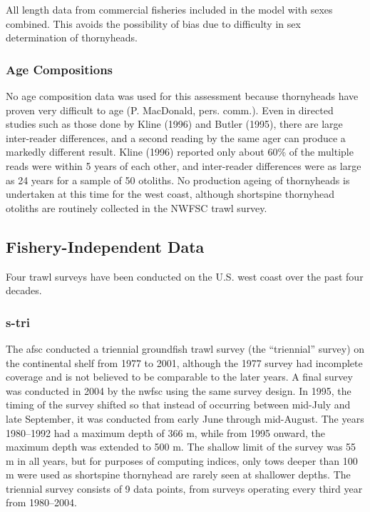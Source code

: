 \documentclass[11pt,
  english,
  letterpaper,
]{article}
\begin{document}
All length data from commercial fisheries included in the model with sexes combined. This avoids the possibility of bias due to difficulty in sex determination of thornyheads.

\hypertarget{age-compositions}{%
\subsubsection{Age Compositions}\label{age-compositions}}

No age composition data was used for this assessment because thornyheads have proven very difficult to age (P. MacDonald, pers. comm.). Even in directed studies such as those done by Kline (1996) and Butler (1995), there are large inter-reader differences, and a second reading by the same ager can produce a markedly different result. Kline (1996) reported only about 60\% of the multiple reads were within 5 years of each other, and inter-reader differences were as large as 24 years for a sample of 50 otoliths. No production ageing of thornyheads is undertaken at this time for the west coast, although shortspine thornyhead otoliths are routinely collected in the NWFSC trawl survey.

\hypertarget{fishery-independent-data}{%
\subsection{Fishery-Independent Data}\label{fishery-independent-data}}

Four trawl surveys have been conducted on the U.S. west coast over the past four decades.

\hypertarget{section}{%
\subsubsection{\texorpdfstring{\acrlong{s-tri}}{}}\label{section}}

The \gls{afsc} conducted a triennial groundfish trawl survey (the ``triennial'' survey) on the continental shelf from 1977 to 2001, although the 1977 survey had incomplete coverage and is not believed to be comparable to the later years. A final survey was conducted in 2004 by the \gls{nwfsc} using the same survey design. In 1995, the timing of the survey shifted so that instead of occurring between mid-July and late September, it was conducted from early June through mid-August. The years 1980--1992 had a maximum depth of 366 m, while from 1995 onward, the maximum depth was extended to 500 m. The shallow limit of the survey was 55 m in all years, but for purposes of computing indices, only tows deeper than 100 m were used as shortspine thornyhead are rarely seen at shallower depths. The triennial survey consists of 9 data points, from surveys operating every third year from 1980--2004.
\end{document}
